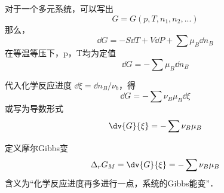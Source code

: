 
\begin{issues}
\issueDraft
\end{issues}


对于一个多元系统，可以写出
\begin{equation}
G=G(p,T,n_1,n_2,...)
\end{equation}
那么，
\begin{equation}
\dd G=-S \dd T +V \dd P + \sum \mu_B \dd n_B
\end{equation}
在等温等压下，p，T均为定值
\begin{equation}
\dd G=-\sum \mu_B \dd n_B
\end{equation}

代入化学反应进度 $\dd \xi=\dd n_B/\nu_b$，得
\begin{equation}
\dd G=-\sum \nu_B \mu_B \dd \xi
\end{equation}
或写为导数形式
\begin{equation}
\dv{G}{\xi}=-\sum \nu_B \mu_B
\end{equation}

定义摩尔Gibbs变
\begin{equation}
\Delta _r G_M = \dv{G}{\xi}=-\sum \nu_B \mu_B
\end{equation}
含义为“化学反应进度再多进行一点，系统的Gibbs能变”．

